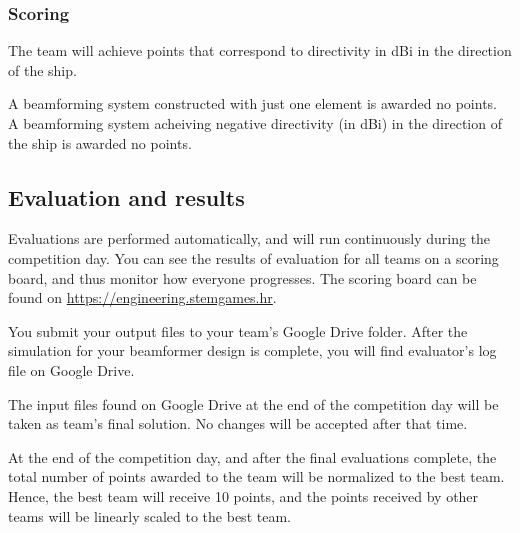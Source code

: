 \documentclass{article}
\begin{document}
\subsubsection*{Scoring}

The team will achieve points that correspond to directivity in dBi in the 
direction of the ship.

A beamforming system constructed with just one element is awarded no points. A 
beamforming system acheiving negative directivity (in dBi) in the direction of 
the ship is awarded no points.

\subsection{Evaluation and results}

Evaluations are performed automatically, and will run continuously during the 
competition day. You can see the results of evaluation for all teams on a 
scoring board, and thus monitor how everyone progresses. The scoring board can 
be found on \url{https://engineering.stemgames.hr}.

You submit your output files to your team's Google Drive folder.
After the simulation for your beamformer design is complete, you will find 
evaluator's log file on Google Drive.

The input files found on Google Drive at the end of the competition day will be 
taken as team's final solution. No changes will be accepted after that time.

At the end of the competition day, and after the final evaluations complete, 
the total number of points awarded to the team will be normalized to the best 
team. Hence, the best team will receive 10 points, and the points received by 
other teams will be linearly scaled to the best team.
		
\end{document}
